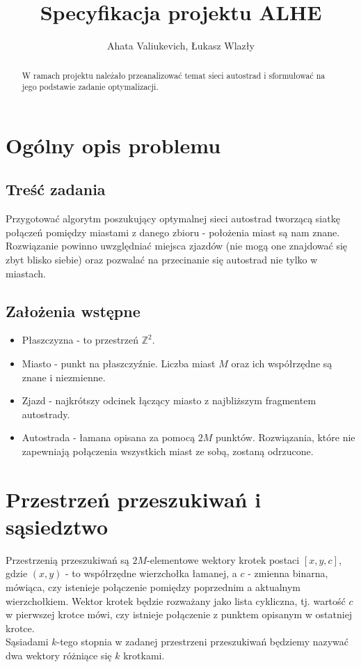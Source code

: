\documentclass{article}
\title{Specyfikacja projektu ALHE}
\author{Ahata Valiukevich, Łukasz Wlazły}
\begin{document}
\maketitle
\begin{abstract}
W ramach projektu należało przeanalizować temat sieci autostrad i sformułować na jego podstawie zadanie optymalizacji.
\end{abstract}

\section{Ogólny opis problemu}
\subsection{Treść zadania}
Przygotować algorytm poszukujący optymalnej sieci autostrad tworzącą siatkę połączeń pomiędzy miastami z danego zbioru - położenia miast są nam znane. Rozwiązanie powinno uwzględniać miejsca zjazdów (nie mogą one znajdować się zbyt blisko siebie) oraz pozwalać na przecinanie się autostrad nie tylko w miastach.
\subsection{Założenia wstępne}
\begin{itemize}
\item Płaszczyzna - to przestrzeń $\mathbb{Z}^{2}$.
\item Miasto - punkt na płaszczyźnie. Liczba miast $M$ oraz ich współrzędne są znane i niezmienne.
\item Zjazd - najkrótszy odcinek łączący miasto z najbliższym fragmentem autostrady.
\item Autostrada - łamana opisana za pomocą $2M$ punktów. Rozwiązania, które nie zapewniają połączenia wszystkich miast ze sobą, zostaną odrzucone.
\end{itemize}

\section{Przestrzeń przeszukiwań i sąsiedztwo}
Przestrzenią przeszukiwań są $2M$-elementowe wektory krotek postaci $[x, y, c]$, gdzie $(x, y)$ - to współrzędne wierzchołka łamanej, a $c$ - zmienna binarna, mówiąca, czy istenieje połączenie pomiędzy poprzednim a aktualnym wierzchołkiem. Wektor krotek będzie rozważany jako lista cykliczna, tj. wartość $c$ w pierwszej krotce mówi, czy istnieje połączenie z punktem opisanym w ostatniej krotce.\\
Sąsiadami $k$-tego stopnia w zadanej przestrzeni przeszukiwań będziemy nazywać dwa wektory różniące się $k$ krotkami.
\end{document}
